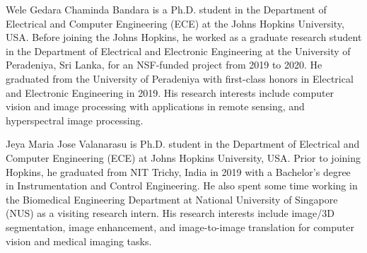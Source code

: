 \documentclass[journal]{IEEEtran}
\begin{document}
\ifCLASSOPTIONcaptionsoff
  \newpage
\fi

















\begin{IEEEbiography}
{Wele Gedara Chaminda Bandara}  is a Ph.D. student in the Department of Electrical and Computer Engineering (ECE) at the Johns Hopkins University, USA. Before joining the Johns Hopkins, he worked as a graduate research student in the Department of Electrical and Electronic Engineering at the University of Peradeniya, Sri Lanka, for an NSF-funded project from 2019 to 2020. He graduated from the University of Peradeniya with first-class honors in Electrical and Electronic Engineering in 2019. His research interests include computer vision and image processing with applications in remote sensing, and  hyperspectral image processing.
\end{IEEEbiography}

\begin{IEEEbiography}
	{ Jeya Maria Jose Valanarasu} is Ph.D. student in the Department
	of Electrical and Computer Engineering (ECE) at
	Johns Hopkins University, USA. Prior to joining Hopkins, he graduated from NIT Trichy, India in 2019 with a Bachelor’s degree in Instrumentation and Control Engineering. He also spent some time working in the Biomedical Engineering Department at National University of Singapore (NUS) as a visiting research intern.
	His research interests include image/3D segmentation, image enhancement, and image-to-image translation for computer vision and medical imaging tasks.
\end{IEEEbiography}
\end{document}
